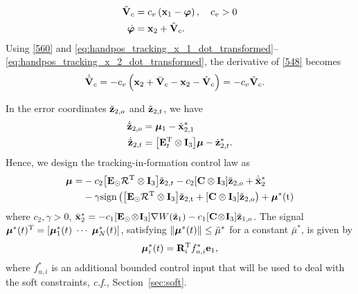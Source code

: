 \begin{subequations}\label{560}\begin{align}
	\hat{\mathbf{V}}_c &= c_v\left(\mathbf{x}_1-\bm{\varphi}\right), \quad c_v>0\label{560-a}\\
	\dot{\bm{\varphi}} &= \mathbf{x}_2 + \hat{\mathbf{V}}_c.\label{560-b}
\end{align}\end{subequations}
Using \eqref{560} and \eqref{eq:handpos_tracking_x_1_dot_transformed}--\eqref{eq:handpos_tracking_x_2_dot_transformed}, the derivative of \eqref{548} becomes
\begin{equation}\label{564}\begin{aligned}[b]
\dot{\tilde{\mathbf{V}}}_c&= -c_v\left(\mathbf{x}_2+\bar{\mathbf{V}}_c-\mathbf{x}_2-\hat{\mathbf{V}}_c\right)=-c_v\tilde{\mathbf{V}}_c.
\end{aligned}\end{equation}

In the error coordinates $\tilde{\mathbf{z}}_{2, o}$ and $\tilde{\mathbf{z}}_{2, t}$, we have
\begin{subequations}\label{559}\begin{align}
	\dot{\tilde{\mathbf{z}}}_{2, o} &= \bm{\mu}_1 - \dot{\mathbf{x}}_{2, 1}^*\label{559-a}\\
	\dot{\tilde{\mathbf{z}}}_{2, t} &= \big[\mathbf{E}_t^{\mathrm{T}}\otimes \mathbf{I}_3\big]\bm{\mu} - \dot{\mathbf{z}}_{2, t}^*.\label{559-b}
	\end{align}\end{subequations}
Hence, we design the tracking-in-formation control law as
\begin{equation}\label{n338}\begin{aligned}[b]
\bm{\mu} = &-c_2\big[\mathbf{E}_\odot \mathcal{R}^{\mathrm{T}}\otimes \mathbf{I}_3\big]\tilde{\mathbf{z}}_{2, t}-c_2[\mathbf{C} \otimes \mathbf{I}_3]\tilde{\mathbf{z}}_{2, o} + \dot{\bar{\mathbf{x}}}_2^*\\&-\gamma\rm{sign}\left(\big[\mathbf{E}_\odot \mathcal{R}^{\mathrm{T}}\otimes \mathbf{I}_3\big]\tilde{\mathbf{z}}_{2, t}+[\mathbf{C} \otimes \mathbf{I}_3]\tilde{\mathbf{z}}_{2, o}\right) + \bm{\mu}^*(t)
\end{aligned}\end{equation}
where $c_2,\gamma>0$, ${\bar{\mathbf{x}}}_2^*=-c_1[\mathbf{E}_\odot\!\otimes\! \mathbf{I}_3]\nabla W(\tilde{\mathbf{z}}_{1})-c_1[\mathbf{C}\!\otimes\! \mathbf{I}_3]\tilde{\mathbf{z}}_{1, o}$. 
The signal $\bm{\mu}^*(t)^{\mathrm{T}}=\left[\bm{\mu}_1^*(t)\;\cdots\;\bm{\mu}_N^*(t)\right]$, satisfying $\left\|\bm{\mu}^*(t)\right\|\leq\bar\mu^*$ for a constant $\bar\mu^*$, is given by
\begin{equation}\label{417}
\bm{\mu}_i^*(t)=\mathbf{R}_i^{\mathrm{T}} f_{u, i}^* \mathbf{e}_1,
\end{equation}
where $f_{u, i}^*$ is an additional bounded control input that will be used to deal with the soft constraints, \emph{c.f.,} Section~\ref{sec:soft}. 

